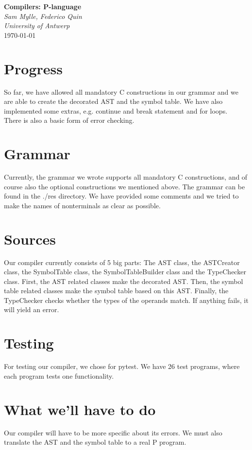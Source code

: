 \documentclass{article}
\begin{document}
\begin{titlepage}
   \begin{center}
      \Large\textbf{Compilers: P-language}\\
      \large\textit{Sam Mylle, Federico Quin \\ University of Antwerp} \\
      \today
   \end{center}
\end{titlepage}

\section{Progress}
So far, we have allowed all mandatory C constructions in our grammar and we are able to create the decorated AST and the symbol table. We have also implemented some extras, e.g. continue and break statement and for loops. \\
There is also a basic form of error checking.

\section{Grammar}
Currently, the grammar we wrote supports all mandatory C constructions, and of course also the optional constructions we mentioned above. The grammar can be found in the ./res directory. We have provided some comments and we tried to make the names of nonterminals as clear as possible.

\section{Sources}
Our compiler currently consists of 5 big parts: The AST class, the ASTCreator class, the SymbolTable class, the SymbolTableBuilder class and the TypeChecker class.
First, the AST related classes make the decorated AST. Then, the symbol table related classes make the symbol table based on this AST. Finally, the TypeChecker checks whether the types of the operands match. If anything fails, it will yield an error.

\section{Testing}
For testing our compiler, we chose for pytest. We have 26 test programs, where each program tests one functionality. 

\section{What we'll have to do}
Our compiler will have to be more specific about its errors. We must also translate the AST and the symbol table to a real P program. 
\end{document}
